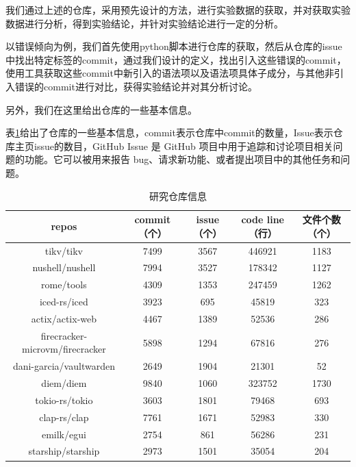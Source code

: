 我们通过上述的仓库，采用预先设计的方法，进行实验数据的获取，并对获取实验数据进行分析，得到实验结论，并针对实验结论进行一定的分析。

以错误倾向为例，我们首先使用python脚本进行仓库的获取，然后从仓库的issue中找出特定标签的commit，通过我们设计的定义，找出引入这些错误的commit，使用工具获取这些commit中新引入的语法项以及语法项具体子成分，与其他非引入错误的commit进行对比，获得实验结论并对其分析讨论。

另外，我们在这里给出仓库的一些基本信息。

表\ref{tab:repo-info}给出了仓库的一些基本信息，commit表示仓库中commit的数量，Issue表示仓库主页issue的数目，GitHub Issue 是 GitHub 项目中用于追踪和讨论项目相关问题的功能。它可以被用来报告 bug、请求新功能、或者提出项目中的其他任务和问题。
\begin{table}[ht]
	\centering
        \caption{研究仓库信息}
	\begin{tabular}{ccccc}
        \toprule
		\textbf{repos}                             & \textbf{commit（个）} & \textbf{issue（个）} & \textbf{code line（行）} & \textbf{文件个数（个）} \\
        \midrule
		tikv/tikv                         & 7499   & 3567  & 446921    & 1183     \\
		nushell/nushell                   & 7994   & 3527  & 178342    & 1127     \\
		rome/tools                        & 4309   & 1353  & 247459    & 1262     \\
		iced-rs/iced                      & 3923   & 695   & 45819     & 323      \\
		  actix/actix-web                 & 4467   & 1389  & 52536     & 286      \\
		  firecracker-microvm/firecracker & 5898   & 1294  & 67816     & 276      \\
		  dani-garcia/vaultwarden         & 2649   & 1904  & 21301     & 52       \\
		  diem/diem                       & 9840   & 1060  & 323752    & 1730     \\
		tokio-rs/tokio                  & 3603   & 1801  & 79468     & 693      \\
		  clap-rs/clap                    & 7761   & 1671  & 52983     & 330      \\
		emilk/egui                        & 2754   & 861   & 56286     & 231      \\
		starship/starship                 & 2973   & 1501  & 35054     & 204  \\
        \bottomrule
	\end{tabular}
	\label{tab:repo-info}
\end{table}


